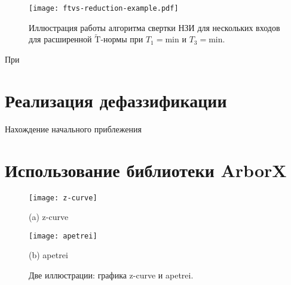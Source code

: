 \begin{figure}
    \label{fig:ftvs-reduction-example}
    \centering
    \texttt{[image: ftvs-reduction-example.pdf]}
    \caption{Иллюстрация работы алгоритма свертки НЗИ для нескольких входов для расширенной $\mathrm{\tilde{T}}$-нормы при $T_1=\mathrm{min}$ и $T_3=\mathrm{min}$.}
\end{figure}

При 



\section{Реализация дефаззификации}

Нахождение начального приблежения

\section{Использование библиотеки ArborX}\label{sec:ch3/sect2}

\begin{figure}[hbt]
	\label{fig:z-curve-apetrei}
	\centering
	\begin{minipage}[b]{0.45\textwidth}
		\centering
		\texttt{[image: z-curve]}
		\caption*{(a) z-curve}
	\end{minipage}\hfill
	\begin{minipage}[b]{0.45\textwidth}
		\centering
		\texttt{[image: apetrei]}
		\caption*{(b) apetrei}
	\end{minipage}
	\caption{Две иллюстрации: графика z-curve и apetrei.}
\end{figure}

